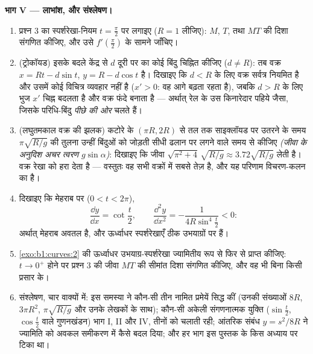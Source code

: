 \begin{problem}
\medskip \noindent\textbf{भाग V --- लाभांश, और संश्लेषण।}
\begin{enumerate}[resume]
  \item प्रश्न 3 का स्पर्शरेखा-नियम $t = \frac\pi2$ पर लगाइए ($R = 1$
  लीजिए): $M$, $T$, तथा $MT$ की दिशा संगणित कीजिए, और उसे $f'(\frac\pi2)$ के
  सामने जाँचिए।
  \item (ट्रोकॉयड) इसके बदले केंद्र से $d$ दूरी पर का कोई बिंदु चिह्नित
  कीजिए ($d \neq R$): तब वक्र $x = Rt - d\sin t$, $y = R - d\cos t$ है।
  दिखाइए कि $d < R$ के लिए वक्र सर्वत्र नियमित है और उसमें कोई विचित्र
  व्यवहार नहीं है ($x' > 0$: वह आगे बढ़ता रहता है), जबकि $d > R$ के लिए भुज
  $x'$ चिह्न बदलता है और वक्र फंदे बनाता है --- अर्थात् रेल के उस किनारेदार
  पहिये जैसा, जिसके परिधि-बिंदु \emph{पीछे की ओर} चलते हैं।
  \item (लघुतमकाल वक्र की झलक) कटोरे के  $(\pi R, 2R)$ से तल तक
  साइक्लॉयड पर उतरने के समय $\pi\sqrt{R/g}$ की तुलना उन्हीं बिंदुओं को
  जोड़ती सीधी ढलान पर लगने वाले समय से कीजिए \emph{(जीवा के अनुदिश अचर त्वरण
  $g\sin\alpha$)}: दिखाइए कि जीवा $\sqrt{\pi^2 + 4}\,\sqrt{R/g} \approx
  3.72\sqrt{R/g}$ लेती है। वक्र रेखा को हरा देता है --- वस्तुतः वह सभी
  वक्रों में सबसे तेज़ है, और यह परिणाम विचरण-कलन का है।
  \item दिखाइए कि मेहराब पर ($0 < t < 2\pi$),
        \[
        \frac{\dd y}{\dd x} = \cot\frac t2,
        \qquad
        \frac{\dd^2 y}{\dd x^2} =
        -\frac{1}{4R\sin^4\frac t2} < 0 :
        \]
        अर्थात् मेहराब अवतल है, और ऊर्ध्वाधर स्पर्शरेखाएँ ठीक उभयाग्रों पर
        हैं।
  \item \cref{exo:b1:curves:2} की ऊर्ध्वाधर उभयाग्र-स्पर्शरेखा ज्यामितीय रूप
  से फिर से प्राप्त कीजिए: $t \to 0^{+}$ होने पर प्रश्न 3 की जीवा $MT$ की
  सीमांत दिशा संगणित कीजिए, और वह भी बिना किसी प्रसार के।
  \item संश्लेषण, चार वाक्यों में: इस समस्या ने कौन-सी तीन नामित प्रमेयें
  सिद्ध कीं (उनकी संख्याओं $8R$, $3\pi R^2$, $\pi\sqrt{R/g}$ और उनके लेखकों
  के साथ); कौन-सी अकेली संगणनात्मक युक्ति ($\sin\frac t2$, $\cos\frac t2$
  वाले गुणनखंडन) भाग I, II और IV, तीनों को चलाती रही; आंतरिक संबंध $y =
  s^2/8R$ ने ज्यामिति को  अवकल समीकरण में कैसे बदल दिया; और हर भाग इस
  पुस्तक के किस अध्याय पर टिका था।
\end{enumerate}
\end{problem}
